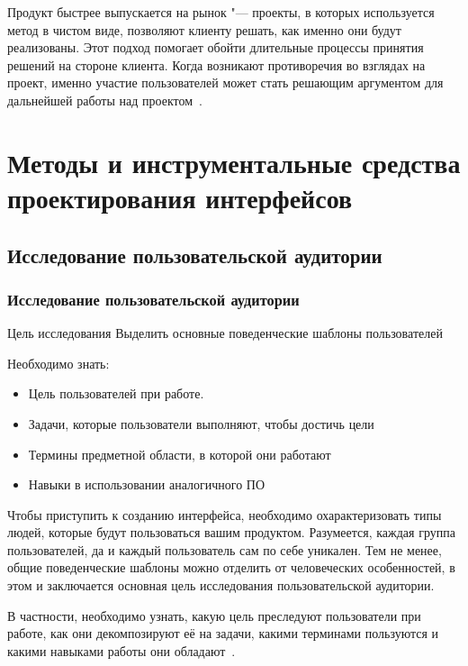 \documentclass{../industrial-development}
\begin{document}
Продукт быстрее выпускается на рынок "--- проекты, в которых используется метод в чистом виде, позволяют клиенту решать, как именно они будут реализованы. Этот подход помогает обойти длительные процессы принятия решений на стороне клиента. Когда возникают противоречия во взглядах на проект, именно участие пользователей может стать решающим аргументом для дальнейшей работы над проектом~\cite[с.~62--65]{Allen}.

\section{Методы и инструментальные средства проектирования интерфейсов}

\subsection{Исследование пользовательской аудитории}

\begin{frame} \frametitle{Исследование пользовательской аудитории}
  \begin{block}{Цель исследования}
   Выделить основные поведенческие шаблоны пользователей
  \end{block}
  
  Необходимо знать:
  \begin{itemize}
   \item Цель пользователей при работе.
   \item Задачи, которые пользователи выполняют, чтобы достичь цели
   \item Термины предметной области, в которой они работают
   \item Навыки в использовании аналогичного ПО
  \end{itemize}
\end{frame}

\lecturenotes

Чтобы приступить к созданию интерфейса, необходимо охарактеризовать типы людей, которые будут пользоваться вашим продуктом. Разумеется, каждая группа пользователей, да и каждый пользователь сам по себе уникален. Тем не менее, общие поведенческие шаблоны можно отделить от человеческих особенностей, в этом и заключается основная цель исследования пользовательской аудитории.

В частности, необходимо узнать, какую цель преследуют пользователи при работе, как они декомпозируют её на задачи, какими терминами пользуются и какими навыками работы они обладают~\cite[с.~25--26]{Tidvell}.
\end{document}
